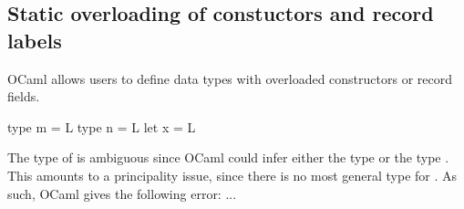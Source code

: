 \documentclass[acmsmall,screen,nonacm]{acmart}
\begin{document}




\subsection{Static overloading of constuctors and record labels}


OCaml allows users to define data types with overloaded constructors or
record fields. 
\begin{program}
type m = L
type n = L
let x = L
\end{program}
The type of  is ambiguous since OCaml could infer either the type
 or the type . This amounts to a principality issue, since
there is no most general type for .   As such, OCaml gives the 
following error: ...
\end{document}

